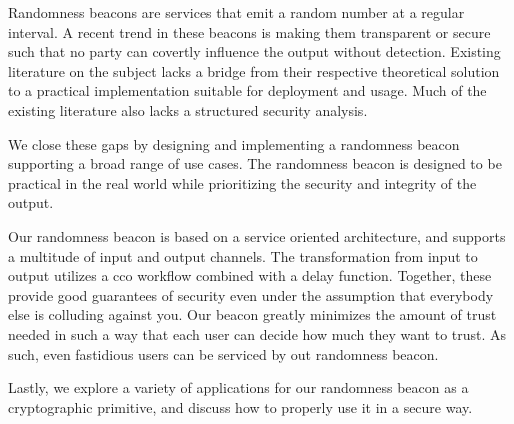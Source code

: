 Randomness beacons are services that emit a random number at a regular interval.
A recent trend in these beacons is making them transparent or secure such that no party can covertly influence the output without detection.
Existing literature on the subject lacks a bridge from their respective theoretical solution to a practical implementation suitable for deployment and usage. Much of the existing literature also lacks a structured security analysis.

We close these gaps by designing and implementing a randomness beacon supporting a broad range of use cases. The randomness beacon is designed to be practical in the real world while prioritizing the security and integrity of the output.

Our randomness beacon is based on a service oriented architecture, and supports a multitude of input and output channels.
The transformation from input to output utilizes a \gls{cco} workflow combined with a delay function. Together, these provide good guarantees of security even under the assumption that everybody else is colluding against you.
Our beacon greatly minimizes the amount of trust needed in such a way that each user can decide how much they want to trust. As such, even fastidious users can be serviced by out randomness beacon. 

Lastly, we explore a variety of applications for our randomness beacon as a cryptographic primitive, and discuss how to properly use it in a secure way.

\glsresetall